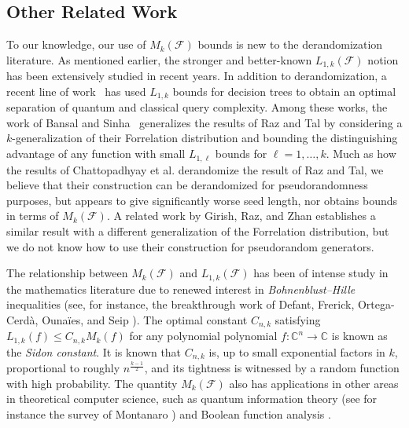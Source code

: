 \subsection{Other Related Work}
{To our knowledge, our use of $M_k(\mathcal{F})$ bounds is new to the derandomization literature.  As mentioned earlier, the stronger and better-known $L_{1,k}(\mathcal{F})$ notion has been extensively studied in recent years.  In addition to derandomization, a recent line of work~\cite{DBLP:journals/eccc/Tal19,DBLP:journals/corr/abs-2008-07003,DBLP:journals/eccc/SherstovSW20} has used $L_{1,k}$ bounds for decision trees to
%
obtain an optimal separation of quantum and classical query complexity.  
Among these works, the work of Bansal and Sinha~\cite{DBLP:journals/corr/abs-2008-07003} generalizes the results of Raz and Tal \cite{RazTal} by considering a $k$-generalization of their Forrelation distribution and bounding the distinguishing advantage of any function with small $L_{1,\ell}$ bounds for $\ell=1,\ldots,k$. 
Much as how the results of Chattopadhyay {et al.} \cite{CHLT} derandomize the result of Raz and Tal, we believe that their construction can be derandomized for pseudorandomness purposes, but appears to give significantly worse seed length, nor obtains bounds in terms of $M_k(\mathcal{F})$. A related work by Girish, Raz, and Zhan \cite{RazXOR} establishes a similar result with a different generalization of the Forrelation distribution, but we do not know how to use their construction for pseudorandom generators.}

%
%

{The relationship between $M_k(\mathcal{F})$ and $L_{1,k}(\mathcal{F})$ has been of intense study in the mathematics literature due to renewed interest in \emph{Bohnenblust--Hille} inequalities (see, for instance, the breakthrough work of Defant, Frerick, Ortega-Cerd\`a, Ouna\"ies, and Seip \cite{defant2011bohnenblust}). The optimal constant $C_{n,k}$ satisfying $L_{1,k}(f)\leq C_{n,k}M_k(f)$ for any polynomial polynomial $f\colon\mathbb{C}^n\to \mathbb{C}$ is known as the \emph{Sidon constant}. It is known that $C_{n,k}$ is, up to small exponential factors in $k$, proportional to roughly $n^{\frac{k-1}{2}}$, and its tightness is witnessed by a random function with high probability.
%
%
The quantity $M_k(\mathcal{F})$ also has applications in other areas in theoretical computer science, such as quantum information theory (see for instance the survey of Montanaro \cite{montanaro2012some}) and Boolean function analysis \cite{DBLP:conf/stacs/Arunachalam0KSW20}.}


